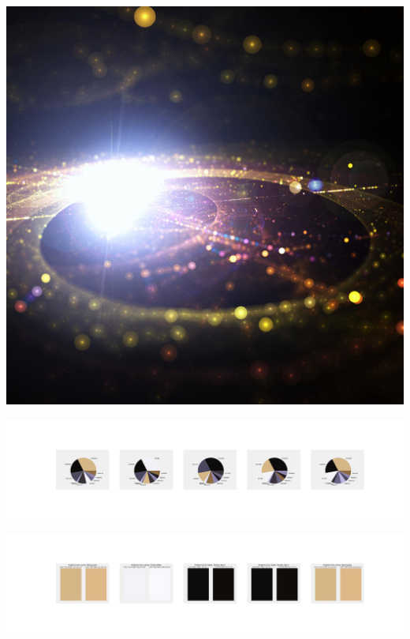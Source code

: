 \documentclass[11pt]{article}
\begin{document}
\begin{landscape}
    \begin{center}
    \includegraphics[width=\textwidth]{./nbimg/file (86).jpg}
    \end{center}

    \begin{center}
    \includegraphics[width=250mm]{./nbimg/pie-436.jpg}
    \end{center}

    \begin{center}
    \includegraphics[width=250mm]{./nbimg/peak-436.jpg}
    \end{center}
    


\end{landscape}
\end{document}
